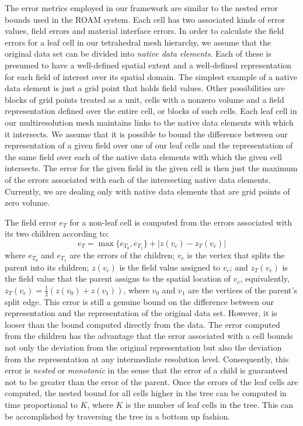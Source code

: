 \documentclass{siggraph}
\begin{document}
The error metrics employed in our framework are similar to the nested
error bounds used in the ROAM system.  Each cell has two associated
kinds of error values, field errors and material interface errors.  In
order to calculate the field errors for a leaf cell in our tetrahedral
mesh hierarchy, we assume that the original data set can be divided
into {\it{native data elements}}.  Each of these is presumed to have a
well-defined spatial extent and a well-defined representation for each
field of interest over its spatial domain.  The simplest example of a
native data element is just a grid point that holds field values.
Other possibilities are blocks of grid points treated as a unit, cells
with a nonzero volume and a field representation defined over the
entire cell, or blocks of such cells.  Each leaf cell in our
multiresolution mesh maintains links to the native data elements with
which it intersects.  We assume that it is possible to bound the
difference between our representation of a given field over one of our
leaf cells and the representation of the same field over each of the
native data elements with which the given cell intersects.  The error
for the given field in the given cell is then just the maximum of the
errors associated with each of the intersecting native data elements.
Currently, we are dealing only with native data elements that are grid
points of zero volume.


The field error $e_T$ for a non-leaf cell is computed from the errors
associated with its two children according to:
\begin{equation}
    e_T = \max \{e_{T_0},e_{T_1}\} + |z(v_c) - z_T(v_c)|
\end{equation}
where $e_{T_0}$ and $e_{T_1}$ are the errors of the children; $v_c$ is
the vertex that splits the parent into its children; $z(v_{c})$ is the
field value assigned to $v_{c}$; and $z_T(v_c)$ is the field value
that the parent assigns to the spatial location of $v_c$,
equivalently, $z_T(v_c)=\frac{1}{2}(z(v_0)+z(v_1))$, where $v_0$ and
$v_1$ are the vertices of the parent's split edge.  This error is
still a genuine bound on the difference between our representation and
the representation of the original data set.  However, it is looser
than the bound computed directly from the data.  The error computed
from the children has the advantage that the error associated with a
cell bounds not only the deviation from the original representation
but also the deviation from the representation at any intermediate
resolution level.  Consequently, this error is \emph{nested} or
\emph{monotonic} in the sense that the error of a child is guaranteed
not to be greater than the error of the parent.  Once the errors of
the leaf cells are computed, the nested bound for all cells higher in
the tree can be computed in time proportional to $K$, where $K$ is the
number of leaf cells in the tree.  This can be accomplished by
traversing the tree in a bottom up fashion.
\end{document}
